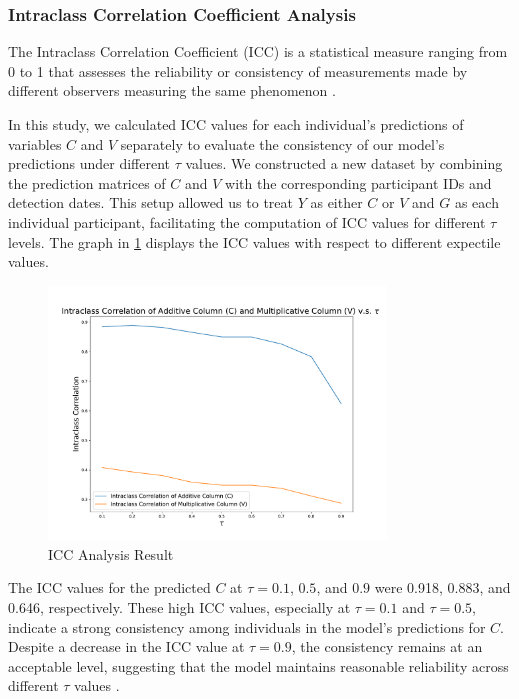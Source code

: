 \documentclass{article}
\begin{document}
\subsubsection{Intraclass Correlation Coefficient Analysis}
The Intraclass Correlation Coefficient (ICC) is a statistical measure ranging from 0 to 1 that assesses the reliability or consistency of measurements made by different observers measuring the same phenomenon \cite{donner1986review}.

In this study, we calculated ICC values for each individual's predictions of variables $C$ and $V$ separately to evaluate the consistency of our model's predictions under different $\tau$ values. We constructed a new dataset by combining the prediction matrices of $C$ and $V$ with the corresponding participant IDs and detection dates. This setup allowed us to treat $Y$ as either $C$ or $V$ and $G$ as each individual participant, facilitating the computation of ICC values for different $\tau$ levels. The graph in \ref{icc} displays the ICC values with respect to different expectile values.

\begin{figure}[H]
\centering
\includegraphics[width=0.8\textwidth]{icc_plot.pdf} 
\caption{ICC Analysis Result} 
\label{icc} 
\end{figure}

The ICC values for the predicted $C$ at $\tau = 0.1$, $0.5$, and $0.9$ were 0.918, 0.883, and 0.646, respectively. These high ICC values, especially at $\tau = 0.1$ and $\tau = 0.5$, indicate a strong consistency among individuals in the model's predictions for $C$. Despite a decrease in the ICC value at $\tau = 0.9$, the consistency remains at an acceptable level, suggesting that the model maintains reasonable reliability across different $\tau$ values \cite{donner1980estimation}.
\end{document}
